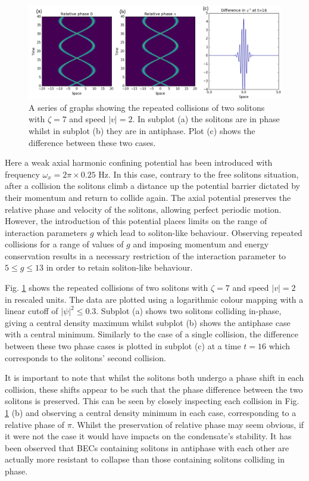 \documentclass[10pt, twocolumn]{revtex4}    %
\begin{document}
\begin{figure}
\includegraphics[width=\textwidth]{difference-g7.png}
\caption{A series of graphs showing the repeated collisions of two solitons with $\zeta=7$ and speed $|v|=2$. In subplot (a) the solitons are in phase whilst in subplot (b) they are in antiphase. Plot (c) shows the difference between these two cases.}
\label{repeated}
\end{figure}

Here a weak axial harmonic confining potential has been introduced with frequency $\omega_x = 2\pi \times 0.25$ Hz. In this case, contrary to the free solitons situation, after a collision the solitons climb a distance up the potential barrier dictated by their momentum and return to collide again. The axial potential preserves the relative phase and velocity of the solitons, allowing perfect periodic motion. However, the introduction of this potential places limits on the range of interaction parameters $g$ which lead to soliton-like behaviour. Observing repeated collisions for a range of values of $g$ and imposing momentum and energy conservation results in a necessary restriction of the interaction parameter to $5 \leq g \leq 13$ in order to retain soliton-like behaviour. 

Fig. \ref{repeated} shows the repeated collisions of two solitons with $\zeta=7$ and speed $|v|=2$ in rescaled units. The data are plotted using a logarithmic colour mapping with a linear cutoff of $|\psi|^2 \leq 0.3$. Subplot (a) shows two solitons colliding in-phase, giving a central density maximum whilst subplot (b) shows the antiphase case with a central minimum. Similarly to the case of a single collision, the difference between these two phase cases is plotted in subplot (c) at a time $t=16$ which corresponds to the solitons' second collision. 

It is important to note that whilst the solitons both undergo a phase shift in each collision, these shifts appear to be such that the phase difference between the two solitons is preserved. This can be seen by closely inspecting each collision in Fig. \ref{repeated} (b) and observing a central density minimum in each case, corresponding to a relative phase of $\pi$. Whilst the preservation of relative phase may seem obvious, if it were not the case it would have impacts on the condensate's stability. It has been observed \cite{Collapse} that BECs containing solitons in antiphase with each other are actually more resistant to collapse than those containing solitons colliding in phase. 
\end{document}
